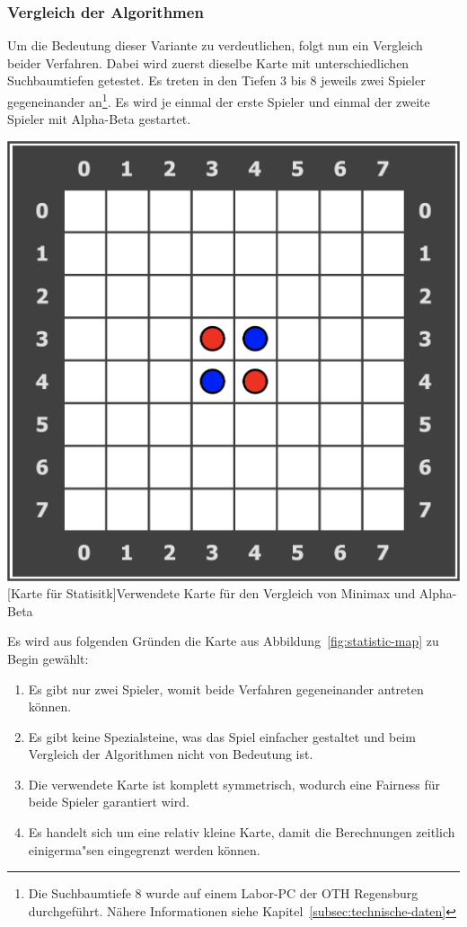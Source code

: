 \subsubsection{Vergleich der Algorithmen}\label{subsubsec:vergleich-der-algorithmen}
Um die Bedeutung dieser Variante zu verdeutlichen, folgt nun ein Vergleich beider Verfahren.
Dabei wird zuerst dieselbe Karte mit unterschiedlichen Suchbaumtiefen getestet.
Es treten in den Tiefen 3 bis 8 jeweils zwei Spieler gegeneinander an\footnote{Die Suchbaumtiefe 8 wurde auf einem Labor-PC der OTH Regensburg durchgef\"uhrt. N\"ahere Informationen siehe Kapitel~\ref{subsec:technische-daten}}.
Es wird je einmal der erste Spieler und einmal der zweite Spieler mit Alpha-Beta gestartet.

\vspace{1em}
\begin{minipage}{\linewidth}
    \centering
    \includegraphics[width=0.3\linewidth]{pics/statistic-map}
    [Karte für Statisitk]{Verwendete Karte für den Vergleich von Minimax und Alpha-Beta}
    \label{fig:statistic-map}
\end{minipage}

Es wird aus folgenden Gr\"unden die Karte aus Abbildung~\ref{fig:statistic-map} zu Begin gew\"ahlt:
\begin{enumerate}
    \item Es gibt nur zwei Spieler, womit beide Verfahren gegeneinander antreten k\"onnen.
    \item Es gibt keine Spezialsteine, was das Spiel einfacher gestaltet und beim Vergleich der Algorithmen nicht von Bedeutung ist.
    \item Die verwendete Karte ist komplett symmetrisch, wodurch eine Fairness f\"ur beide Spieler garantiert wird.
    \item Es handelt sich um eine relativ kleine Karte, damit die Berechnungen zeitlich einigerma"sen eingegrenzt werden k\"onnen.
\end{enumerate}

